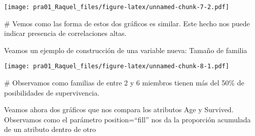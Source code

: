 \documentclass[]{article}
\newenvironment{Shaded}{\begin{snugshade}}{\end{snugshade}}
\newcommand{\CommentTok}[1]{\textcolor[rgb]{0.50,0.62,0.50}{#1}}
\newcommand{\DataTypeTok}[1]{\textcolor[rgb]{0.87,0.87,0.75}{#1}}
\newcommand{\DecValTok}[1]{\textcolor[rgb]{0.86,0.86,0.80}{#1}}
\newcommand{\KeywordTok}[1]{\textcolor[rgb]{0.94,0.87,0.69}{#1}}
\newcommand{\NormalTok}[1]{\textcolor[rgb]{0.80,0.80,0.80}{#1}}
\newcommand{\OperatorTok}[1]{\textcolor[rgb]{0.94,0.94,0.82}{#1}}
\newcommand{\StringTok}[1]{\textcolor[rgb]{0.80,0.58,0.58}{#1}}
\begin{document}
\texttt{[image: pra01\_Raquel\_files/figure-latex/unnamed-chunk-7-2.pdf]}

\begin{Shaded}
\begin{Highlighting}[]
\CommentTok{\# Vemos como las forma de estos dos gráficos es similar. Este hecho nos puede indicar presencia de correlaciones altas.}
\end{Highlighting}
\end{Shaded}

Veamos un ejemplo de construcción de una variable nueva: Tamaño de
familia

\begin{Shaded}
\end{Shaded}

\texttt{[image: pra01\_Raquel\_files/figure-latex/unnamed-chunk-8-1.pdf]}

\begin{Shaded}
\begin{Highlighting}[]
\CommentTok{\# Observamos como familias de entre 2 y 6 miembros tienen más del 50\% de posibilidades de supervivencia.  }
\end{Highlighting}
\end{Shaded}

Veamos ahora dos gráficos que nos compara los atributos Age y
Survived.\\
Observamos como el parámetro position=``fill'' nos da la proporción
acumulada de un atributo dentro de otro
\end{document}
